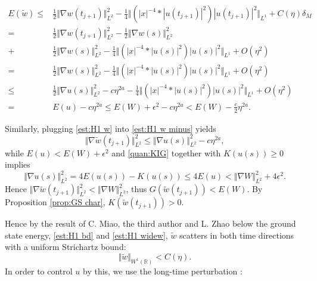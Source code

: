 \documentclass[reqno, 11pt]{amsart}
\numberwithin{equation}{section}
\newcommand{\R}{\mathbb{R}}
\theoremstyle{plain}
\theoremstyle{definition}
\numberwithin{equation}{section}
\numberwithin{theorem}{section}
\numberwithin{equation}{section}
\numberwithin{equation}{section}
\numberwithin{theorem}{section}
\begin{document}
	\begin{equation}\label{est:E widew}
	\begin{aligned}
	E(\widetilde{w})\leq& \frac{1}{2}\Vert \nabla w(t_{j+1}) \Vert_{L^2}^2-\frac{1}{4} \Vert{\left(|x|^{-4}*|u(t_{j+1})|^2\right)|u(t_{j+1})|^2}\Vert_{L^1}+C(\eta)\delta_{M}\\=&\frac{1}{2}\Vert \nabla w(t_{j+1}) \Vert_{L^2}^2-\frac{1}{2}\Vert \nabla w(s) \Vert_{L^2}^2\\+&\frac{1}{2}\Vert \nabla w(s) \Vert_{L^2}^2-\frac{1}{4} \Vert{\left(|x|^{-4}*|u(s)|^2\right)|u(s)|^2}\Vert_{L^1}+O(\eta^2)\\=& \frac{1}{2}\Vert \nabla w(s) \Vert_{L^2}^2 - \frac{1}{4} \Vert{\left(|x|^{-4}*|u(s)|^2\right)|u(s)|^2}\Vert_{L^1}+O(\eta^2) \\\leq&\frac{1}{2}\Vert \nabla u(s) \Vert_{L^2}^2-c\eta^{2a}- \frac{1}{4} \Vert{\left(|x|^{-4}*|u(s)|^2\right)|u(s)|^2}\Vert_{L^1}+O(\eta^2) \\=& E(u)-c\eta^{2a} \leq E(W)+\epsilon^2-c\eta^{2a}<E(W)-\frac{c}{2}\eta^{2a}.
	\end{aligned}
	\end{equation} 
	
	Similarly, plugging \eqref{est:H1 w} into \eqref{est:H1 w minus} yields 
	\begin{equation}\label{est:H1 widew}
	\Vert \nabla\widetilde{w}(t_{j+1}) \Vert_{L^2}^2 \leq \Vert \nabla u(s) \Vert_{L^2}^2-c\eta^{2a},
	\end{equation} 
	while $E(u)<E(W)+\epsilon^2$ and \eqref{quan:KIG} together with $K(u(s))\geq 0$ implies 
	\begin{equation*}
	\Vert \nabla u(s) \Vert_{L^2}^2=4E(u(s))-K(u(s))\leq 4E(u)<\Vert \nabla W \Vert_{L^2}^2+4\epsilon^2.
	\end{equation*} 
	Hence $\Vert \nabla\widetilde{w}(t_{j+1}) \Vert_{L^2}^2 < \Vert \nabla W \Vert_{L^2}^2$, thus $G(\widetilde{w}(t_{j+1}))<E(W)$. By Proposition \ref{prop:GS char}, $K(\widetilde{w}(t_{j+1}))>0$.
	
	Hence by the result of C. Miao, the third author and L. Zhao \cite{MXZ:crit Hart:f rad} below the ground state energy, \eqref{est:H1 bd} and \eqref{est:H1 widew}, $\widetilde{w}$ scatters in both time directions with a uniform Strichartz bound:
	\begin{equation}\label{est:W1 widew}
	\Vert \widetilde{w} \Vert_{W^1(\R)}<C(\eta).
	\end{equation} 
	In order to control $u$ by this, we use the long-time perturbation  \cite[Proposition 2.3]{MXZ:crit Hart:f rad}:
	
\end{document}
